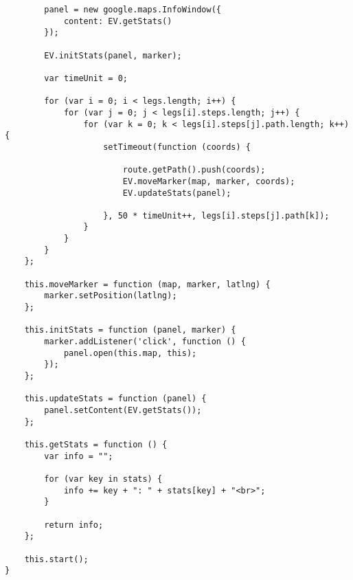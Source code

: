 \begin{verbatim}
        panel = new google.maps.InfoWindow({
            content: EV.getStats()
        });

        EV.initStats(panel, marker);

        var timeUnit = 0;

        for (var i = 0; i < legs.length; i++) {
            for (var j = 0; j < legs[i].steps.length; j++) {
                for (var k = 0; k < legs[i].steps[j].path.length; k++) {
                    setTimeout(function (coords) {

                        route.getPath().push(coords);
                        EV.moveMarker(map, marker, coords);
                        EV.updateStats(panel);

                    }, 50 * timeUnit++, legs[i].steps[j].path[k]);
                }
            }
        }
    };

    this.moveMarker = function (map, marker, latlng) {
        marker.setPosition(latlng);
    };

    this.initStats = function (panel, marker) {
        marker.addListener('click', function () {
            panel.open(this.map, this);
        });
    };

    this.updateStats = function (panel) {
        panel.setContent(EV.getStats());
    };

    this.getStats = function () {
        var info = "";

        for (var key in stats) {
            info += key + ": " + stats[key] + "<br>";
        }

        return info;
    };

    this.start();
}
\end{verbatim}




